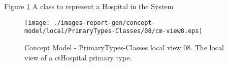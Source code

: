 Figure \ref{fig:lu.uni.lassy.excalibur.examples.icrash-CM-view-local-PrimaryTypes-Classes-08} A class to represent a Hospital in the System



\begin{figure}[htbp] 
\label{fig:lu.uni.lassy.excalibur.examples.icrash-CM}
\begin{center}
\texttt{[image: ./images-report-gen/concept-model/local/PrimaryTypes-Classes/08/cm-view8.eps]}
\end{center}
\caption[Concept Model - PrimaryTypes-Classes local view 08 - The local view of a ctHospital prima]{Concept Model - PrimaryTypes-Classes local view 08. The local view of a ctHospital primary type.}
\label{fig:lu.uni.lassy.excalibur.examples.icrash-CM-view-local-PrimaryTypes-Classes-08}
\end{figure}
\vspace{0.5cm} 
